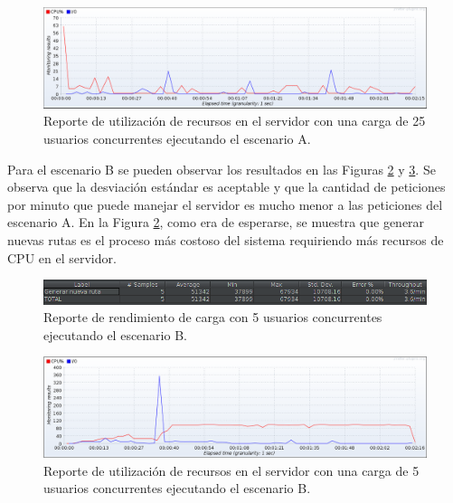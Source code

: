 \begin{figure}[H]
    \centering
    \includegraphics[width=\textwidth]{25_usuarios_plan_a_cpu.png}
    \caption{Reporte de utilización de recursos en el servidor con una carga de 25 usuarios concurrentes ejecutando el escenario A.}
    \label{fig:25UsuariosCPUA}
\end{figure}

Para el escenario B se pueden observar los resultados en las Figuras \ref{fig:5UsuariosCargaB} y \ref{fig:5UsuariosCPUB}. Se observa que la desviación estándar es aceptable y que la cantidad de peticiones por minuto que puede manejar el servidor es mucho menor a las peticiones del escenario A. En la Figura \ref{fig:5UsuariosCargaB}, como era de esperarse, se muestra que generar nuevas rutas es el proceso más costoso del sistema requiriendo más recursos de CPU en el servidor.

\begin{figure}[H]
    \centering
    \includegraphics[width=\textwidth]{Chapter7/Chapter7Figs/5_usuarios_doc_editado_.png}
    \caption{Reporte de rendimiento de carga con 5 usuarios concurrentes ejecutando el escenario B.}
    \label{fig:5UsuariosCargaB}
\end{figure}

\begin{figure}[H]
    \centering
    \includegraphics[width=\textwidth]{5_usuarios_plan_b_cpu_.png}
    \caption{Reporte de utilización de recursos en el servidor con una carga de 5 usuarios concurrentes ejecutando el escenario B.}
    \label{fig:5UsuariosCPUB}
\end{figure}

